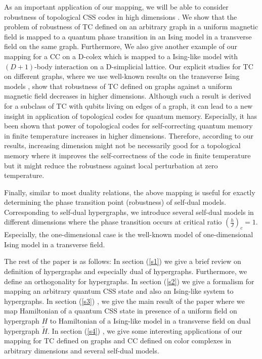 \documentclass[preprintnumbers, showpacs, floatfix,twocolumn,
preprintnumbers, superscriptaddress]{revtex4}
\begin{document}
As an important application of our mapping, we will be able to
consider robustness of topological CSS codes in high dimensions
\cite{delgad, Bombin2015, Bravi2011, Sapta2009}. We show that the
problem of robustness of TC defined on an arbitrary graph in a uniform
magnetic field is mapped to a quantum phase transition in an Ising
model in a transverse field on the same graph. Furthermore, We
also give another example of our mapping for a CC on a D-colex
which is mapped to a Ising-like model with $(D+1)$-body
interaction on a D-simplicial lattice. Our explicit studies for TC
on different graphs, where we use well-known results on the
transverse Ising models \cite{trans}, show that robustness of TC defined on graphs
against a uniform magnetic field decreases in higher dimensions.
Although such a result is derived for a subclass of TC with qubits living on edges of a graph, it can lead to a new insight in application of
topological codes for quantum memory. Especially, it has been
shown \cite{bombin2016} that power of topological codes for
self-correcting quantum memory in finite temperature increases in
higher dimensions. Therefore, according to our results, increasing
dimension might not be necessarily good for a topological memory
where it improves the self-correctness of the code in finite
temperature but it might reduce the robustness against local
perturbation at zero temperature. 

Finally, similar to most duality relations, the above mapping is
useful for exactly determining the phase transition point
(robustness) of self-dual models. Corresponding to self-dual
hypergraphs, we introduce several self-dual models in different
dimensions where the phase transition occurs at critical ratio
$(\frac{h}{J})_c =1$. Especially, the one-dimensional case is the
well-known model of one-dimensional Ising model in a transverse
field.

The rest of the paper is as follows: In section (\ref{s1}) we give a brief review on definition of hypergraphs and especially dual of hypergraphs. Furthermore, we define an orthogonality for hypergraphs. In section (\ref{s2})  we give a formalism for mapping an arbitrary quantum CSS state and also an Ising-like system to hypergraphs. In section (\ref{s3}) , we give the main result of the paper where we map Hamiltonian of a quantum CSS state in presence of a uniform field on hypergraph $H$ to Hamiltonian of a Ising-like model in a transverse field on dual hypergraph $\tilde{H}$. In section (\ref{s4}) , we give some interesting applications of our mapping for TC defined on graphs and CC defined on color complexes in arbitrary dimensions and several self-dual models.
\end{document}
